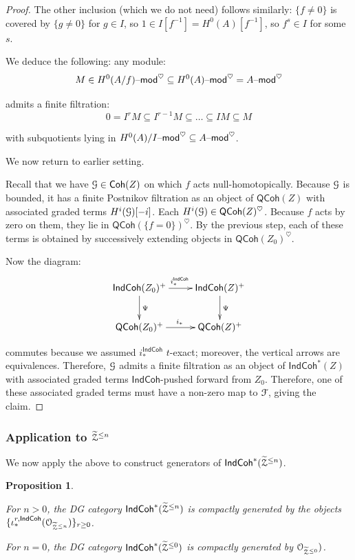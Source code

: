 \documentclass[reqno,11pt]{amsart}
\numberwithin{equation}{subsection}
\newtheorem{prop}[thm]{Proposition}
\theoremstyle{remark}
\newcommand{\sF}{{\EuScript F}}
\newcommand{\sG}{{\EuScript G}}
\newcommand{\sO}{{\EuScript O}}
\newcommand{\sZ}{{\EuScript Z}}
\newcommand{\mathendash}{\text{\textendash}}
\renewcommand{\mod}{\mathendash\mathsf{mod}}
\newcommand{\heart}{\heartsuit}
\newcommand{\Coh}{\mathsf{Coh}}
\newcommand{\IndCoh}{\mathsf{IndCoh}}
\newcommand{\QCoh}{\mathsf{QCoh}}
\renewcommand{\subset}{\subseteq}
\begin{document}
\begin{proof}
The other inclusion (which we do not need) follows similarly: $\{f \neq 0\}$ is covered
by $\{g \neq 0\}$ for $g \in I$, so $1 \in I[f^{-1}] = H^0(A)[f^{-1}]$,
so $f^s \in I$ for some $s$.

We deduce the following: any module: 
%
\[
M \in H^0(A/f)\mod^{\heart} \subset H^0(A)\mod^{\heart} = 
A\mod^{\heart}
\]

\noindent admits a finite filtration:
%
\[
0 = I^r M \subset I^{r-1} M \subset \ldots \subset IM \subset M
\]

\noindent with subquotients lying in $H^0(A)/I\mod^{\heart} \subset A\mod^{\heart}$.

\step We now return to earlier setting.

Recall that we have $\sG \in \Coh(Z)$ on which $f$ acts null-homotopically.
Because $\sG$ is bounded, it has a finite Postnikov filtration as an object
of $\QCoh(Z)$
with associated graded terms $H^i(\sG)[-i]$. 
Each $H^i(\sG) \in 
\QCoh(Z)^{\heart}$. Because $f$ acts by zero on them, they lie
in $\QCoh(\{f = 0\})^{\heart}$. By the previous step, each
of these terms is obtained by successively extending 
objects in $\QCoh(Z_0)^{\heart}$.

Now the diagram:
%
\[
\xymatrix{
\IndCoh(Z_0)^+ \ar[r]^{i_*^{\IndCoh}} \ar[d]^{\Psi} & \IndCoh(Z)^+ \ar[d]^{\Psi} \\
\QCoh(Z_0)^+ \ar[r]^{i_*} & \QCoh(Z)^+}
\]

\noindent commutes because we assumed $i_*^{\IndCoh}$ $t$-exact;
moreover, the vertical arrows are equivalences. Therefore, $\sG$
admits a finite filtration as an object of $\IndCoh^*(Z)$
with associated graded terms $\IndCoh$-pushed forward from $Z_0$. 
Therefore, one of these associated graded terms must have a non-zero map
to $\sF$, giving the claim.  

\end{proof}

\subsubsection{Application to $\widetilde{\sZ}^{\leq n}$}

We now apply the above to construct generators of $\IndCoh^*(\widetilde{\sZ}^{\leq n})$.

\begin{prop}\label{p:tilde-z-gens}

For
$n > 0$, the DG category $\IndCoh^*(\widetilde{\sZ}^{\leq n})$ is compactly 
generated by the objects 
$\{\iota_*^{r,\IndCoh}(\sO_{\widetilde{\sZ}^{\leq n}})\}_{r \geq 0}$.

For $n = 0$, the DG category $\IndCoh^*(\widetilde{\sZ}^{\leq 0})$ is compactly 
generated by $\sO_{\widetilde{\sZ}^{\leq 0}})$.

\end{prop}
\end{document}
